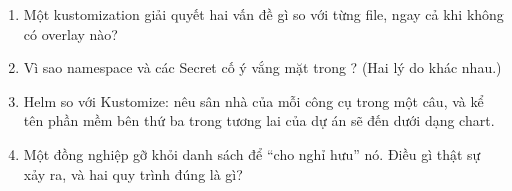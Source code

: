 \begin{quiz}
\begin{enumerate}
  \item Một kustomization giải quyết hai vấn đề gì so với
   từng file, ngay cả khi không có overlay nào?
  \item Vì sao namespace và các Secret cố ý vắng mặt trong
  ? (Hai lý do khác nhau.)
  \item Helm so với Kustomize: nêu sân nhà của mỗi công cụ trong một
  câu, và kể tên phần mềm bên thứ ba trong tương lai của dự án sẽ đến
  dưới dạng chart.
  \item Một đồng nghiệp gỡ  khỏi danh sách để
  ``cho nghỉ hưu'' nó. Điều gì thật sự xảy ra, và hai quy trình đúng
  là gì?
\end{enumerate}
\end{quiz}
